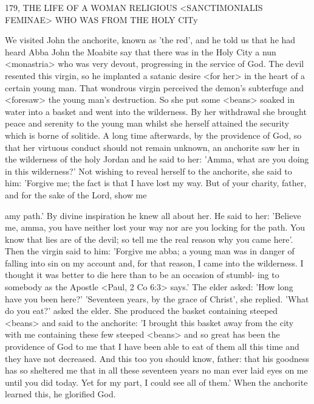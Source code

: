 179, THE LIFE OF A WOMAN RELIGIOUS
<SANCTIMONIALIS FEMINAE>
WHO WAS FROM THE HOLY CITy

We visited John the anchorite, known as 'the red', and he told us
that he had heard Abba John the Moabite say that there was in the
Holy City a nun <monastria> who was very devout, progressing in
the service of God. The devil resented this virgin, so he implanted
a satanic desire <for her> in the heart of a certain young man. That
wondrous virgin perceived the demon's subterfuge and <foresaw>
the young man's destruction. So she put some <beans> soaked in
water into a basket and went into the wilderness. By her withdrawal
she brought peace and serenity to the young man whilst she herself
attained the security which is borne of solitide. A long time
afterwards, by the providence of God, so that her virtuous conduct
should not remain unknown, an anchorite saw her in the wilderness
of the holy Jordan and he said to her: 'Amma, what are you doing
in this wilderness?' Not wishing to reveal herself to the anchorite,
she said to him: 'Forgive me; the fact is that I have lost my way.
But of your charity, father, and for the sake of the Lord, show me

amy path.' By divine inspiration he knew all about her. He said to
her: 'Believe me, amma, you have neither lost your way nor are you
locking for the path. You know that lies are of the devil; so tell me
the real reason why you came here'. Then the virgin said to him:
'Forgive me abba; a young man was in danger of falling into sin on
my account and, for that reason, I came into the wilderness. I
thought it was better to die here than to be an occasion of stumbl-
ing to somebody as the Apostle <Paul, 2 Co 6:3> says.' The elder
asked: 'How long have you been here?' 'Seventeen years, by the
grace of Christ', she replied. 'What do you eat?' asked the elder. She
produced the basket containing steeped <beans> and said to the
anchorite: 'I brought this basket away from the city with me
containing these few steeped <beans> and so great has been the
providence of God to me that I have been able to eat of them all
this time and they have not decreased. And this too you should
know, father: that his goodness has so sheltered me that in all these
seventeen years no man ever laid eyes on me until you did today.
Yet for my part, I could see all of them.' When the anchorite
learned this, he glorified God.

